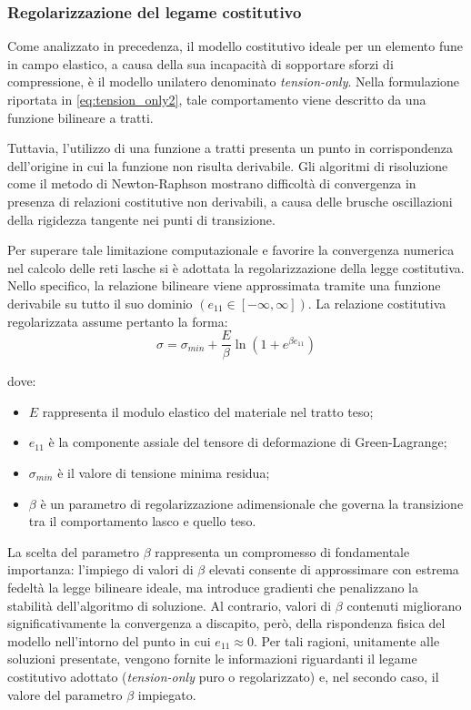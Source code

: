 \subsubsection{Regolarizzazione del legame costitutivo}
Come analizzato in precedenza, il modello costitutivo ideale per un elemento fune in campo elastico, a causa della sua incapacità di sopportare sforzi di compressione, è il modello unilatero denominato \textit{tension-only}. Nella formulazione riportata in \cref{eq:tension_only2}, tale comportamento viene descritto da una funzione bilineare a tratti.

Tuttavia, l'utilizzo di una funzione a tratti presenta un punto in corrispondenza dell'origine in cui la funzione non risulta derivabile. Gli algoritmi di risoluzione come il metodo di Newton-Raphson mostrano difficoltà di convergenza in presenza di relazioni costitutive non derivabili, a causa delle brusche oscillazioni della rigidezza tangente nei punti di transizione. 

Per superare tale limitazione computazionale e favorire la convergenza numerica nel calcolo delle reti lasche si è adottata la regolarizzazione della legge costitutiva. Nello specifico, la relazione bilineare viene approssimata tramite una funzione derivabile su tutto il suo dominio $(e_{11} \in [-\infty, \infty])$. La relazione costitutiva regolarizzata assume pertanto la forma:
\begin{equation}
   \sigma = \sigma_{min} + \frac{E}{\beta} \ln\left( 1 + e^{\beta e_{11}} \right) 
   \label{eq:bilinear_smooth}
\end{equation}

dove: 
\begin{itemize}
   \item $E$ rappresenta il modulo elastico del materiale nel tratto teso;
   \item $e_{11}$ è la componente assiale del tensore di deformazione di Green-Lagrange;
   \item $\sigma_{min}$ è il valore di tensione minima residua;
   \item $\beta$ è un parametro di regolarizzazione adimensionale che governa la transizione tra il comportamento lasco e quello teso.
\end{itemize}

La scelta del parametro $\beta$ rappresenta un compromesso di fondamentale importanza: l'impiego di valori di $\beta$ elevati consente di approssimare con estrema fedeltà la legge bilineare ideale, ma introduce gradienti che penalizzano la stabilità dell'algoritmo di soluzione. Al contrario, valori di $\beta$ contenuti migliorano significativamente la convergenza a discapito, però, della rispondenza fisica del modello nell'intorno del punto in cui $e_{11} \approx 0$. Per tali ragioni, unitamente alle soluzioni presentate, vengono fornite le informazioni riguardanti il legame costitutivo adottato (\textit{tension-only} puro o regolarizzato) e, nel secondo caso, il valore del parametro $\beta$ impiegato.

